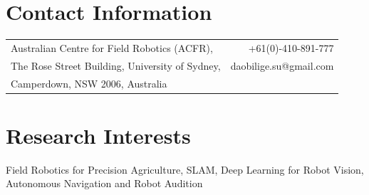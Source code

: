 \documentclass[margin,line]{res}
\begin{document}

\begin{resume}



\section{\sc Contact Information}
\vspace{.05in}
\begin{tabularx}{\textwidth}{X r}
Australian Centre for Field Robotics (ACFR),      &  +61(0)-410-891-777 \\            
The Rose Street Building, University of Sydney,   & daobilige.su@gmail.com \\
Camperdown, NSW 2006, Australia   & \\%
\end{tabularx}



\section{\sc Research Interests}
Field Robotics for Precision Agriculture, SLAM, Deep Learning for Robot Vision, Autonomous Navigation and Robot Audition



\end{resume}
\end{document}
